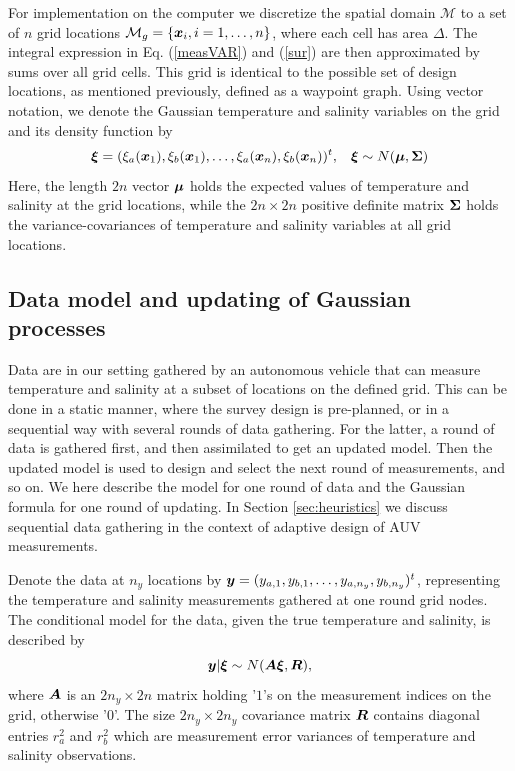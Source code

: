 \documentclass[aoas]{imsart}
\begin{document}
For implementation on the computer we discretize the spatial domain $\mathcal{M}$ to a
set of $n$ grid locations $\mathcal{M}_g = \{{\boldsymbol x}_i, i=1,\ldots,n \}$, where each cell has area $\Delta$. The integral expression in Eq. (\ref{measVAR}) and (\ref{sur}) are then approximated by sums over all grid cells.
This grid is identical to the possible set of design locations, as mentioned previously, defined as a waypoint graph. Using vector notation, we denote the Gaussian temperature and salinity variables on the grid and its density function by
\begin{equation}\label{prior}
    \bxi = (\xi_a(\bx_1),\xi_b(\bx_1),\ldots,\xi_a(\bx_n),\xi_b(\bx_n))^t, \hspace{3mm}
    \bxi  \sim  N(\bmu, \bSigma) %
\end{equation}
Here, the length
$2 n$ vector ${\boldsymbol \mu}$ holds the expected values of temperature and
salinity at the grid locations, while the $2n \times 2n$ positive definite  matrix ${\boldsymbol \Sigma}$ holds the variance-covariances of temperature and salinity variables at all grid locations.

\subsection{Data model and updating of Gaussian processes}

Data are in our setting gathered by an autonomous vehicle that can measure
temperature and salinity at a subset of locations on the defined grid. This can be done in a static manner, where the survey design is pre-planned, or in a sequential way with several rounds of data gathering. For the latter, a round of data is gathered first, and then assimilated to get an updated model. Then the updated model is used to design and select the next round of measurements, and so on. 
We here describe the model for one round of data and the Gaussian formula for one round of updating. In Section
\ref{sec:heuristics} we discuss sequential data gathering in the context of adaptive design of AUV measurements.

Denote the data at $n_y$ locations by
${\boldsymbol y}=(y_{a,1},y_{b,1},\ldots,y_{a,n_y},y_{b,n_y})^t$, representing the
temperature and salinity measurements gathered at one round grid nodes. The conditional model for the data, given the true temperature and salinity, is described by
\begin{equation}\label{likelihood}
\by | \bxi \sim N( \bA \bxi, \bR), %
\end{equation}
where ${\boldsymbol A}$ is an $2n_y \times 2n$ matrix holding '$1$'s on the
measurement indices on the grid, otherwise '$0$'. The size
$2n_y \times 2n_y$ covariance matrix ${\boldsymbol R}$ contains diagonal entries $r^2_a$ and
$r^2_b$ which are measurement error variances of temperature and
salinity observations.
\end{document}
